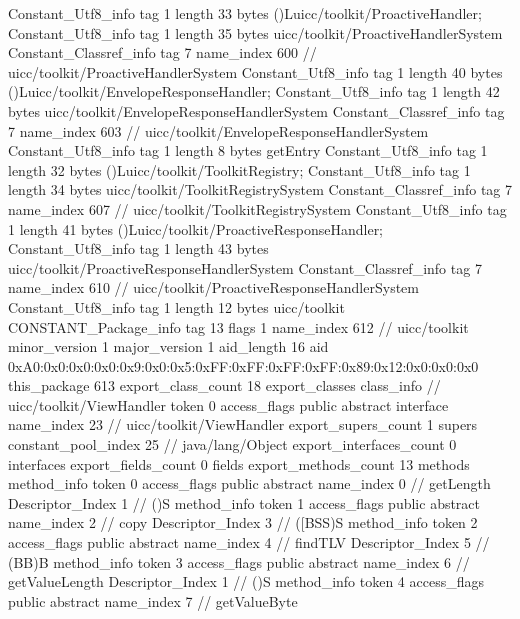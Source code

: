 {{{		}
		Constant_Utf8_info {
			tag	1
			length	33
			bytes	()Luicc/toolkit/ProactiveHandler;
		}
		Constant_Utf8_info {
			tag	1
			length	35
			bytes	uicc/toolkit/ProactiveHandlerSystem
		}
		Constant_Classref_info {
			tag	7
			name_index	600		// uicc/toolkit/ProactiveHandlerSystem
		}
		Constant_Utf8_info {
			tag	1
			length	40
			bytes	()Luicc/toolkit/EnvelopeResponseHandler;
		}
		Constant_Utf8_info {
			tag	1
			length	42
			bytes	uicc/toolkit/EnvelopeResponseHandlerSystem
		}
		Constant_Classref_info {
			tag	7
			name_index	603		// uicc/toolkit/EnvelopeResponseHandlerSystem
		}
		Constant_Utf8_info {
			tag	1
			length	8
			bytes	getEntry
		}
		Constant_Utf8_info {
			tag	1
			length	32
			bytes	()Luicc/toolkit/ToolkitRegistry;
		}
		Constant_Utf8_info {
			tag	1
			length	34
			bytes	uicc/toolkit/ToolkitRegistrySystem
		}
		Constant_Classref_info {
			tag	7
			name_index	607		// uicc/toolkit/ToolkitRegistrySystem
		}
		Constant_Utf8_info {
			tag	1
			length	41
			bytes	()Luicc/toolkit/ProactiveResponseHandler;
		}
		Constant_Utf8_info {
			tag	1
			length	43
			bytes	uicc/toolkit/ProactiveResponseHandlerSystem
		}
		Constant_Classref_info {
			tag	7
			name_index	610		// uicc/toolkit/ProactiveResponseHandlerSystem
		}
		Constant_Utf8_info {
			tag	1
			length	12
			bytes	uicc/toolkit
		}
		CONSTANT_Package_info {
			tag	13
			flags	1
			name_index	612		// uicc/toolkit
			minor_version	1
			major_version	1
			aid_length	16
			aid	0xA0:0x0:0x0:0x0:0x9:0x0:0x5:0xFF:0xFF:0xFF:0xFF:0x89:0x12:0x0:0x0:0x0
		}
	}
	this_package	613
	export_class_count	18
	export_classes {
		class_info {		// uicc/toolkit/ViewHandler
			token	0
			access_flags	public abstract interface
			name_index	23		// uicc/toolkit/ViewHandler
			export_supers_count	1
			supers {
				constant_pool_index	25		// java/lang/Object
			}
			export_interfaces_count	0
			interfaces {
			}
			export_fields_count	0
			fields {
			}
			export_methods_count	13
			methods {
				method_info {
					token	0
					access_flags	public abstract
					name_index	0		// getLength
					Descriptor_Index	1		// ()S
				}
				method_info {
					token	1
					access_flags	public abstract
					name_index	2		// copy
					Descriptor_Index	3		// ([BSS)S
				}
				method_info {
					token	2
					access_flags	public abstract
					name_index	4		// findTLV
					Descriptor_Index	5		// (BB)B
				}
				method_info {
					token	3
					access_flags	public abstract
					name_index	6		// getValueLength
					Descriptor_Index	1		// ()S
				}
				method_info {
					token	4
					access_flags	public abstract
					name_index	7		// getValueByte
}}}}}
